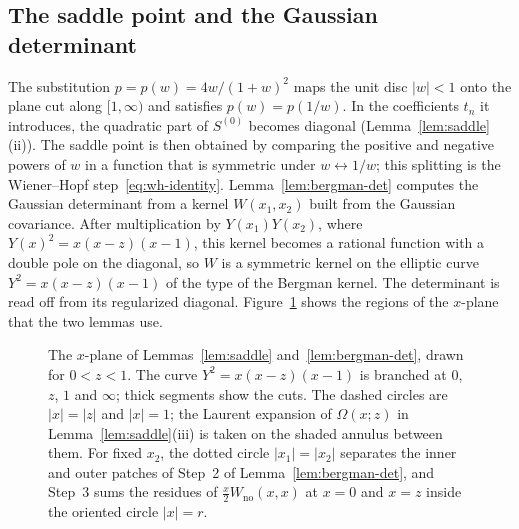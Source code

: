 \documentclass[twoside,10pt]{article}
\numberwithin{equation}{section}
\theoremstyle{slbody}
\theoremstyle{definition}
\theoremstyle{remark}
\begin{document}
\subsection{The saddle point and the Gaussian determinant}

The substitution \(p=p(w)=4w/(1+w)^2\) maps the unit disc \(|w|<1\) onto the
plane cut along \([1,\infty)\) and satisfies \(p(w)=p(1/w)\).  In the
coefficients \(t_n\) it introduces, the quadratic part of \(S^{(0)}\) becomes
diagonal (Lemma~\ref{lem:saddle}(ii)).  The saddle point is then obtained by
comparing the positive and negative powers of \(w\) in a function that is
symmetric under \(w\leftrightarrow1/w\); this splitting is the Wiener--Hopf
step~\eqref{eq:wh-identity}.  Lemma~\ref{lem:bergman-det} computes the
Gaussian determinant from a kernel \(W(x_1,x_2)\) built from the Gaussian
covariance.  After multiplication by \(Y(x_1)Y(x_2)\), where
\(Y(x)^2=x(x-z)(x-1)\), this kernel becomes a rational function with a double
pole on the diagonal, so \(W\) is a symmetric kernel on the elliptic curve
\(Y^2=x(x-z)(x-1)\) of the type of the Bergman kernel.  The determinant is
read off from its regularized diagonal.  Figure~\ref{fig:x-plane} shows the
regions of the \(x\)-plane that the two lemmas use.

\begin{figure}[ht]
\centering
{}
\caption{The \(x\)-plane of Lemmas~\ref{lem:saddle} and~\ref{lem:bergman-det},
drawn for \(0<z<1\).  The curve \(Y^2=x(x-z)(x-1)\) is branched at \(0\),
\(z\), \(1\) and \(\infty\); thick segments show the cuts.  The dashed circles
are \(|x|=|z|\) and \(|x|=1\); the Laurent expansion of \(\Omega(x;z)\) in
Lemma~\ref{lem:saddle}(iii) is taken on the shaded annulus between them.  For
fixed \(x_2\), the dotted circle \(|x_1|=|x_2|\) separates the inner and outer
patches of Step~2 of Lemma~\ref{lem:bergman-det}, and Step~3 sums the residues
of \(\frac x2W_{\mathrm{no}}(x,x)\) at \(x=0\) and \(x=z\) inside the oriented
circle \(|x|=r\).}
\label{fig:x-plane}
\end{figure}
\end{document}
